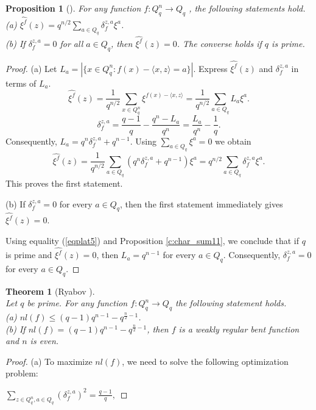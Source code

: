 \documentclass[11pt]{article}
\newtheorem{theorem}{Theorem}[section]
\newtheorem{claim}{Proposition}[section]
\theoremstyle{definition}
\begin{document}
{{{\begin{claim}[]\label{rbent2}
For any function $f:Q_q^n\rightarrow Q_q$ , the following statements hold.\\
{\rm (a)}  $\widehat{\xi^f}(z)=q^{n/2}\sum\limits_{a\in Q_q}\delta^{z,a}_f\xi^a$.\\
{\rm (b)}  If $\delta^{z,a}_f=0$ for all $a\in Q_q$, then
$\widehat{\xi^f}(z)=0$. The converse holds if $q$ is prime.
\end{claim}
\begin{proof}
(a) Let $L_a=|\{x\in Q^n_q : f(x)-\langle x,z\rangle=a\}|$. Express
$\widehat{\xi^f}(z)$
 and $\delta^{z,a}_f$ in terms of $L_a$.
\begin{equation}\label{eqplat5}
\widehat{\xi^f}(z)=\frac{1}{q^{n/2}}\sum\limits_{x\in
Q^n_q}\xi^{f(x)-\langle
x,z\rangle}=\frac{1}{q^{n/2}}\sum\limits_{a\in Q_q}L_a\xi^a.
\end{equation}
$$\delta^{z,a}_f=\frac{q-1}{q}-\frac{q^n-L_a}{q^n}=\frac{L_a}{q^n}-\frac{1}{q}.$$
Consequently,
$L_a=q^n\delta_f^{z,a}+q^{n-1}$.
Using $\sum\limits_{a\in Q_q}\xi^a=0$ we obtain
$$\widehat{\xi^f}(z)=\frac{1}{q^{n/2}}\sum\limits_{a\in Q_q}(q^n\delta^{z,a}_f+q^{n-1})
\xi^a=q^{n/2}\sum\limits_{a\in Q_q}\delta^{z,a}_f\xi^a.$$ This proves the first statement.

(b) 
If $\delta_f^{z,a}=0$ for every $a\in Q_q$, then the first statement immediately gives
$\widehat{\xi^f}(z)=0$.

 Using equality (\ref{eqplat5}) and Proposition
\ref{c:char_sum11}, we conclude that if $q$
is prime and $\widehat{\xi^f}(z)=0$, then $L_a=q^{n-1}$ for every $a\in Q_q$.
Consequently, $\delta^{z,a}_f=0$ for every $a\in Q_q$.
\end{proof}

\begin{theorem}[Ryabov \cite{Ryabov21}]\label{thbent3}\quad \\ Let $q$ be prime. For any function $f:Q_q^n\rightarrow Q_q$ the following statement holds. \\
{\rm (a)} 
$nl(f)\leq (q-1)q^{n-1}-q^{\frac{n}{2}-1}$.\\
 {\rm (b)} If $nl(f)= (q-1)q^{n-1}-q^{\frac{n}{2}-1}$, then
 $f$ is a weakly regular bent function and $n$ is even.
\end{theorem}
\begin{proof}
(a)  To maximize
$nl(f)$, we need to solve the following optimization problem:

$\sum\limits_{z\in Q^n_q ,a\in
Q_q}(\delta^{z,a}_f)^2=\frac{q-1}{q},$


\end{proof}}}}
\end{document}
